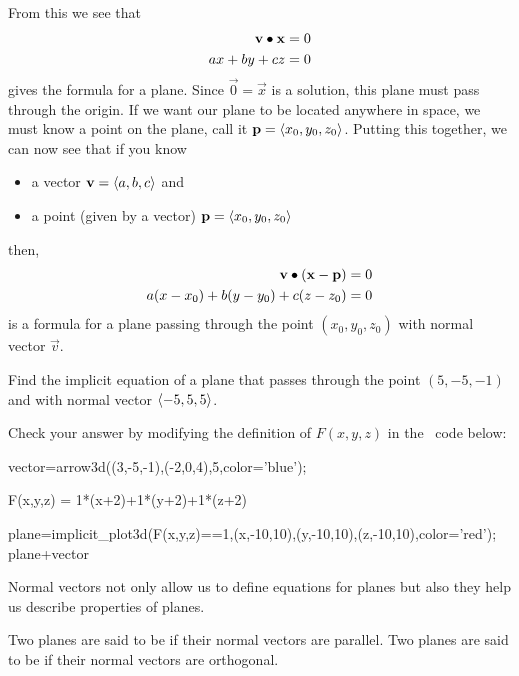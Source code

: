 \documentclass{ximera}
\begin{document}
From this we see that
\begin{align*}
\mathbf{v}\bullet\mathbf{x} &=0\\
ax+by+cz &= 0
\end{align*}
gives the formula for a plane. Since $\vec{0} = \vec{x}$ is a
solution, this plane must pass through the origin. If we want our
plane to be located anywhere in space, we must know a point on the
plane, call it $\mathbf{p}=\left\langle x_0,y_0,z_0\right\rangle$. Putting this together, we can
now see that if you know
\begin{itemize}
  \item a vector $\mathbf{v} = \left\langle a,b,c\right\rangle$ and
  \item a point (given by a vector) $\mathbf{p} = \left\langle x_0,y_0,z_0\right\rangle$
\end{itemize}
then,
\begin{align*}
  \mathbf{v}\bullet(\mathbf{x}-\mathbf{p}) &= 0\\
  a(x-x_0) + b(y-y_0) + c(z-z_0) &= 0
\end{align*}
is a formula for a plane passing through the point $(x_0,y_0,z_0)$
with normal vector $\vec{v}$.

\begin{question}
  Find the implicit equation of a plane that passes through the point
  $(5,-5,-1)$ and with normal vector $\left\langle -5,5,5\right\rangle$.
  \begin{onlineOnly}
    Check your answer by modifying the definition of $F(x,y,z)$ in
    the \sage\ code below:
  \begin{sageCell}
vector=arrow3d((3,-5,-1),(-2,0,4),5,color='blue');

F(x,y,z) = 1*(x+2)+1*(y+2)+1*(z+2)

plane=implicit_plot3d(F(x,y,z)==1,(x,-10,10),(y,-10,10),(z,-10,10),color='red');
plane+vector
  \end{sageCell}
  \end{onlineOnly}
\end{question}

Normal vectors not only allow us to define equations for planes but also 
they help us describe properties of planes.

\begin{definition}
  Two planes are said to be  if their normal vectors are
  parallel. Two planes are said to be  if their normal
  vectors are orthogonal.
\end{definition}
\end{document}
